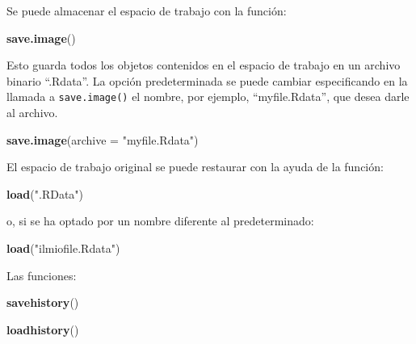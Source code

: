 \documentclass[
]{article}
\newenvironment{Shaded}{\begin{snugshade}}{\end{snugshade}}
\newcommand{\AttributeTok}[1]{\textcolor[rgb]{0.13,0.29,0.53}{#1}}
\newcommand{\FunctionTok}[1]{\textcolor[rgb]{0.13,0.29,0.53}{\textbf{#1}}}
\newcommand{\NormalTok}[1]{#1}
\newcommand{\StringTok}[1]{\textcolor[rgb]{0.31,0.60,0.02}{#1}}
\begin{document}
Se puede almacenar el espacio de trabajo con la función:

\begin{Shaded}
\begin{Highlighting}[]
\FunctionTok{save.image}\NormalTok{()}
\end{Highlighting}
\end{Shaded}

Esto guarda todos los objetos contenidos en el espacio de trabajo en un archivo binario ``.Rdata''. La opción predeterminada se puede cambiar especificando en la llamada a \texttt{save.image()} el nombre, por ejemplo, ``myfile.Rdata'', que desea darle al archivo.

\begin{Shaded}
\begin{Highlighting}[]
\FunctionTok{save.image}\NormalTok{(}\AttributeTok{archive =} \StringTok{"myfile.Rdata"}\NormalTok{)}
\end{Highlighting}
\end{Shaded}

El espacio de trabajo original se puede restaurar con la ayuda de la función:

\begin{Shaded}
\begin{Highlighting}[]
\FunctionTok{load}\NormalTok{(}\StringTok{".RData"}\NormalTok{)}
\end{Highlighting}
\end{Shaded}

o, si se ha optado por un nombre diferente al predeterminado:

\begin{Shaded}
\begin{Highlighting}[]
\FunctionTok{load}\NormalTok{(}\StringTok{"ilmiofile.Rdata"}\NormalTok{)}
\end{Highlighting}
\end{Shaded}

Las funciones:

\begin{Shaded}
\begin{Highlighting}[]
\FunctionTok{savehistory}\NormalTok{()}
\end{Highlighting}
\end{Shaded}

\begin{Shaded}
\begin{Highlighting}[]
\FunctionTok{loadhistory}\NormalTok{()}
\end{Highlighting}
\end{Shaded}
\end{document}
